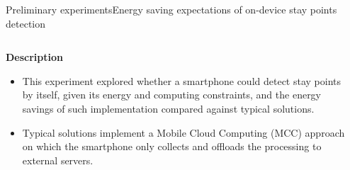 \begin{frame}[noframenumbering]{Preliminary experiments}{Energy saving expectations of on-device stay points detection}
\small
\vspace{-0.5cm}
\begin{columns}
\begin{column}{0.55\textwidth}
\begin{block}{\small \textbf{Description}}
\begin{itemize}
  \item This experiment explored whether a smartphone could detect stay points by itself, given its energy and computing constraints, and the energy savings of such implementation compared against typical solutions.
  \item Typical solutions implement a Mobile Cloud Computing (MCC) approach on which the smartphone only collects and offloads the processing to external servers.
\end{itemize}
\end{block}
\end{column}

\begin{column}{0.4\textwidth}
\begin{table}
\centering
\renewcommand{\arraystretch}{0.8}
\caption{Input parameters for the energy saving expectations of on-device stay points detection experiment.}
\end{table}
\end{column}
\end{columns}


\end{frame}
